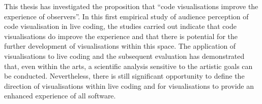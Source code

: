 This thesis has investigated the proposition that ``code visualisations improve the experience of observers''. In this first empirical study of audience perception of code visualisation in live coding, the studies carried out indicate that code visualisations do improve the experience and that there is potential for the further development of visualisations within this space. The application of visualisations to live coding and the subsequent evaluation has demonstrated that, even within the arts, a scientific analysis sensitive to the artistic goals can be conducted. Nevertheless, there is still significant opportunity to define the direction of visualisations within live coding and for visualisations to provide an enhanced experience of all software.

